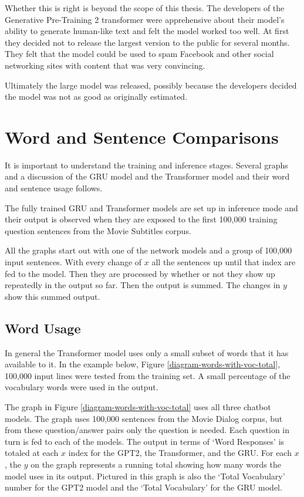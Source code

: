 Whether this is right is beyond the scope of this thesis. The developers of the Generative Pre-Training 2 transformer were apprehensive about their model's ability to generate human-like text and felt the model worked too well. 
At first they decided not to release the largest version to the public for several months. 
They felt that the model could be used to spam Facebook and other social networking sites with content that was very convincing. 


Ultimately the large model was released, possibly because the developers decided the model was not as good as originally estimated. %

\section{Word and Sentence Comparisons}

It is important to understand the training and inference stages. Several graphs and a discussion of the GRU model and the Transformer model and their word and sentence usage follows.

The fully trained GRU and Transformer models are set up in inference mode and their output is observed when they are exposed to the first 100,000 training question sentences from the Movie Subtitles corpus.

All the graphs start out with one of the network models and a group of 100,000 input sentences. With every change of $x$ all the sentences up until that index are fed to the model. Then they are processed by whether or not they show up repeatedly in the output so far. Then the output is summed. The changes in $y$ show this summed output.

\subsection{Word Usage}

In general the Transformer model uses only a small subset of words that it has available to it. In the example below, Figure \ref{diagram-words-with-voc-total}, 100,000 input lines were tested from the training set. A small percentage of the vocabulary words were used in the output. %

The graph in Figure \ref{diagram-words-with-voc-total} uses all three chatbot models. The graph uses 100,000 sentences from the Movie Dialog corpus, but from these question/answer pairs only the question is needed. Each question in turn is fed to each of the models. The output in terms of `Word Responses' is totaled at each $x$ index for the GPT2, the Transformer, and the GRU. For each $x$, the $y$ on the graph represents a running total showing how many words the model uses in its output. Pictured in this graph is also the `Total Vocabulary' number for the GPT2 model and the `Total Vocabulary' for the GRU model.

